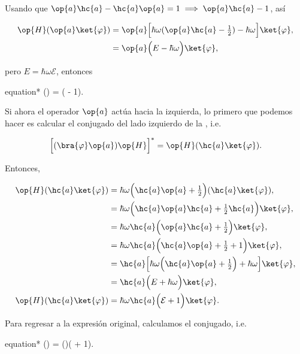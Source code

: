 \documentclass[../main.tex]{subfiles}
\begin{document}
\begin{problema}[30]
	Usando que \(\op{a}\hc{a} - \hc{a}\op{a} = 1 \implies \op{a}\hc{a} - 1\), así

	\begin{align*}
		\op{H}(\op{a}\ket{\varphi}) & = \op{a}\Bigl[\hbar\omega(\op{a}\hc{a} - \tfrac{1}{2}) - \hbar\omega\Bigr]\ket{\varphi}, \\
		                            & = \op{a}\Bigl(E - \hbar\omega\Bigr)\ket{\varphi},
	\end{align*}

	pero \(E = \hbar\omega \mathcal{E}\), entonces

	\begin{empheq}[box = \mainresult]{equation*}
		(\ket{\varphi})  = \hbar\omega {}( - 1)\ket{\varphi}.
	\end{empheq}

	Si ahora el operador \(\op{a}\) actúa hacia la izquierda, lo primero que
	podemos hacer es calcular el conjugado del lado izquierdo de la , i.e.

	\begin{equation*}
		\Bigl[(\bra{\varphi}\op{a})\op{H}\Bigr]^{*} = \op{H}(\hc{a}\ket{\varphi}).
	\end{equation*}

	Entonces,

	\begin{align*}
		\op{H}(\hc{a}\ket{\varphi}) & = \hbar\omega \Bigl(\hc{a}\op{a} + \tfrac{1}{2}\Bigr)(\hc{a}\ket{\varphi}),                         \\
		                            & = \hbar\omega \Bigl(\hc{a}\op{a}\hc{a} + \tfrac{1}{2}\hc{a}\Bigr)\ket{\varphi},                     \\
		                            & = \hbar\omega \hc{a}\Bigl(\op{a}\hc{a} + \tfrac{1}{2}\Bigr)\ket{\varphi},                           \\
		                            & = \hbar\omega \hc{a}\Bigl(\hc{a}\op{a} + \tfrac{1}{2} + 1\Bigr)\ket{\varphi},                       \\
		                            & = \hc{a}\Bigl[\hbar\omega \Bigl(\hc{a}\op{a} + \tfrac{1}{2}\Bigr) + \hbar\omega\Bigr]\ket{\varphi}, \\
		                            & = \hc{a}\Bigl(E + \hbar\omega\Bigr)\ket{\varphi},                                                   \\
		\op{H}(\hc{a}\ket{\varphi}) & = \hbar\omega \hc{a}\Bigl(\mathcal{E} + 1\Bigr)\ket{\varphi}.
	\end{align*}

	Para regresar a la expresión original, calculamos el conjugado, i.e.

	\begin{empheq}[box = \mainresult]{equation*}
		(\bra{\varphi}) = (\bra{\varphi})\hbar\omega( + 1).
	\end{empheq}
\end{problema}
\end{document}
